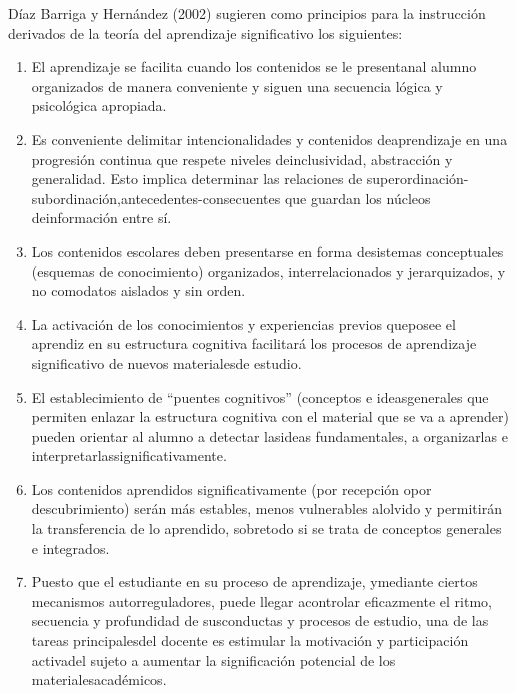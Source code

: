 \documentclass[12pt]{report}
\theoremstyle{largebreak}
\begin{document}
    Díaz Barriga y Hernández (2002) sugieren como principios para la instrucción
    derivados de la teoría del aprendizaje significativo los siguientes:
    \begin{enumerate}
        \item El aprendizaje se facilita cuando los contenidos se le presentanal alumno
        organizados de manera conveniente y siguen una secuencia lógica y psicológica
        apropiada.
        \item Es conveniente delimitar intencionalidades y contenidos deaprendizaje en una
        progresión continua que respete niveles deinclusividad, abstracción y generalidad.
        Esto
        implica
        determinar
        las
        relaciones
        de
        superordinación-
        subordinación,antecedentes-consecuentes que guardan los núcleos deinformación
        entre sí.
        \item Los contenidos escolares deben presentarse en forma desistemas conceptuales
        (esquemas de conocimiento) organizados, interrelacionados y jerarquizados, y no
        comodatos aislados y sin orden.
        \item La activación de los conocimientos y experiencias previos queposee el aprendiz
        en su estructura cognitiva facilitará los procesos de aprendizaje significativo de nuevos
        materialesde estudio.
        \item El establecimiento de “puentes cognitivos” (conceptos e ideasgenerales que
        permiten enlazar la estructura cognitiva con el material que se va a aprender) pueden
        orientar al alumno a detectar lasideas fundamentales, a organizarlas e
        interpretarlassignificativamente.
        \item Los contenidos aprendidos significativamente (por recepción opor
        descubrimiento) serán más estables, menos vulnerables alolvido y permitirán la
        transferencia de lo aprendido, sobretodo si se trata de conceptos generales e
        integrados.
        \item Puesto que el estudiante en su proceso de aprendizaje, ymediante ciertos
        mecanismos autorreguladores, puede llegar acontrolar eficazmente el ritmo, secuencia
        y profundidad de susconductas y procesos de estudio, una de las tareas principalesdel
        docente es estimular la motivación y participación activadel sujeto a aumentar la
        significación potencial de los materialesacadémicos.
    \end{enumerate}
\end{document}
